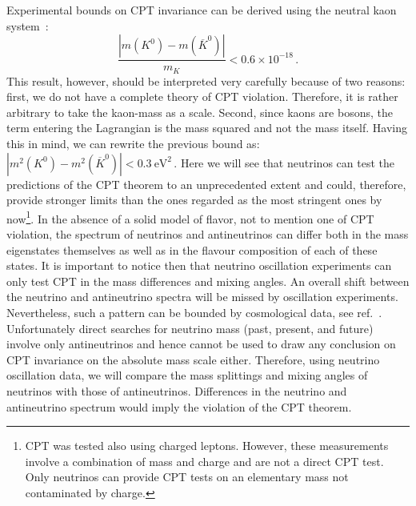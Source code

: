 Experimental bounds on CPT invariance can be derived using the neutral kaon system~\cite{Schwingenheuer:1995uf}:
%
\begin{equation}
  \frac{|m(K^0) - m(\overline{K}^0)|}{m_K} < 0.6 \times 10^{-18}\,. 
  \label{eq:mK}
\end{equation}
%
This result, however, should be interpreted very carefully because of two reasons: first, we do not have a complete theory of CPT violation. Therefore, it is rather arbitrary to take the kaon-mass as a scale. Second, since kaons are bosons, the term entering the Lagrangian is the mass squared and not the mass itself. Having this in mind, we can rewrite the previous bound as:
%
 $ |m^2(K^0) - m^2(\overline{K}^0)| < 0.3~\mbox{eV}^2 \, $.
%
Here we will see that neutrinos can test the predictions of the CPT theorem to an unprecedented extent and could, therefore, provide stronger limits than the ones regarded as the most stringent ones by now\footnote{CPT was tested also using charged leptons. However, these measurements involve a combination
of mass and charge and are not a direct CPT test. Only neutrinos can provide CPT tests on an elementary mass not contaminated by charge.}. 
%
In the absence of a solid model of flavor, not to mention one of CPT violation, the spectrum  of neutrinos and antineutrinos can differ both  in the mass eigenstates themselves as well as in the flavour composition of each of these states. It is important to notice then that neutrino oscillation experiments can  only test CPT in the mass differences and mixing angles. An overall shift between the neutrino and antineutrino spectra will be missed by oscillation experiments.  Nevertheless, such a pattern can be bounded by cosmological data, see ref.~\cite{Barenboim:2017vlc}. Unfortunately direct searches for neutrino mass (past, present, and future) involve only antineutrinos and hence 
cannot be used to draw any conclusion on  CPT invariance on the absolute mass scale either.
%
Therefore, using neutrino oscillation data, we will compare the mass splittings and mixing angles of  neutrinos with those of antineutrinos. Differences in the neutrino and antineutrino spectrum would imply the violation of the CPT theorem.
